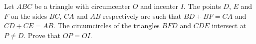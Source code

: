 Let $ABC$ be a triangle with circumcenter $O$ and incenter $I$. The points $D$, $E$ and $F$ on the sides $BC$, $CA$ and $AB$ respectively are such that $BD + BF = CA$ and $CD + CE = AB$. The circumcircles of the triangles $BFD$ and $CDE$ intersect at $P \neq D$. Prove that $OP = OI$.
